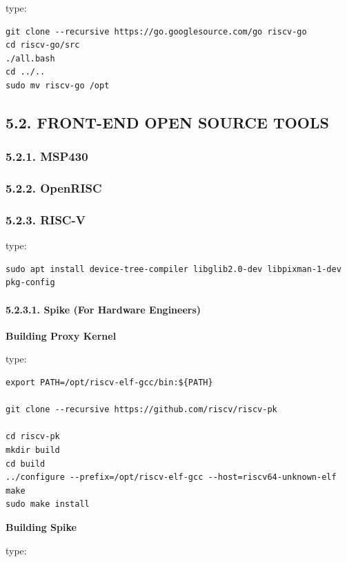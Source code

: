 \documentclass[]{article}
\let\oldparagraph\paragraph
\renewcommand{\paragraph}[1]{\oldparagraph{#1}\mbox{}}
\begin{document}
type:

\begin{verbatim}
git clone --recursive https://go.googlesource.com/go riscv-go
cd riscv-go/src
./all.bash
cd ../..
sudo mv riscv-go /opt
\end{verbatim}

\subsection{5.2. FRONT-END OPEN SOURCE
TOOLS}\label{front-end-open-source-tools-1}

\subsubsection{5.2.1. MSP430}\label{msp430-1}

\subsubsection{5.2.2. OpenRISC}\label{openrisc-1}

\subsubsection{5.2.3. RISC-V}\label{risc-v-1}

type:

\begin{verbatim}
sudo apt install device-tree-compiler libglib2.0-dev libpixman-1-dev pkg-config
\end{verbatim}

\paragraph{5.2.3.1. Spike (For Hardware
Engineers)}\label{spike-for-hardware-engineers}

\textbf{Building Proxy Kernel}

type:

\begin{verbatim}
export PATH=/opt/riscv-elf-gcc/bin:${PATH}

git clone --recursive https://github.com/riscv/riscv-pk

cd riscv-pk
mkdir build
cd build
../configure --prefix=/opt/riscv-elf-gcc --host=riscv64-unknown-elf
make
sudo make install
\end{verbatim}

\textbf{Building Spike}

type:
\end{document}
